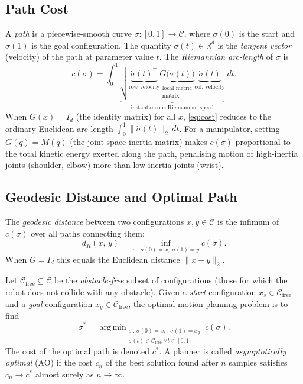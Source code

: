 \documentclass[journal]{IEEEtran}
\newcommand{\Cfree}{\mathcal{C}_{\mathrm{free}}}
\newcommand{\Cspace}{\mathcal{C}}
\newcommand{\dR}{d_{\!R}}
\DeclareMathOperator*{\argmin}{arg\,min}
\begin{document}
\subsection*{Path Cost}

A \emph{path} is a piecewise-smooth curve
$\sigma : [0,1] \to \Cspace$, where $\sigma(0)$ is the start and
$\sigma(1)$ is the goal configuration.
The quantity $\dot{\sigma}(t) \in \mathbb{R}^d$ is the \emph{tangent
vector} (velocity) of the path at parameter value $t$.
The \emph{Riemannian arc-length} of $\sigma$ is
\begin{equation}\label{eq:cost}
  c(\sigma)
  = \int_0^1 \!\underbrace{\sqrt{
      \underbrace{\dot{\sigma}(t)^\top}_{\text{row velocity}}
      \underbrace{G\!\bigl(\sigma(t)\bigr)}_{\substack{\text{local metric}\\\text{matrix}}}
      \underbrace{\dot{\sigma}(t)}_{\text{col.\ velocity}}
    }}_{\text{instantaneous Riemannian speed}}\; dt.
\end{equation}
When $G(x) = I_d$ (the identity matrix) for all $x$, \cref{eq:cost}
reduces to the ordinary Euclidean arc-length $\int_0^1\!\|\dot\sigma(t)\|_2\,dt$.
For a manipulator, setting $G(q) = M(q)$ (the joint-space inertia matrix)
makes $c(\sigma)$ proportional to the total kinetic energy exerted along
the path, penalising motion of high-inertia joints (shoulder, elbow) more
than low-inertia joints (wrist).

\subsection*{Geodesic Distance and Optimal Path}

The \emph{geodesic distance} between two configurations
$x, y \in \Cspace$ is the infimum of $c(\sigma)$ over all paths connecting
them:
\begin{equation}\label{eq:geodesic}
  \dR(x,\,y)
  = \inf_{\sigma\,:\,\sigma(0)=x,\;\sigma(1)=y} c(\sigma).
\end{equation}
When $G = I_d$ this equals the Euclidean distance $\|x - y\|_2$.

Let $\Cfree \subseteq \Cspace$ be the \emph{obstacle-free} subset
of configurations (those for which the robot does not collide with any
obstacle).
Given a \emph{start} configuration $x_s \in \Cfree$ and a
\emph{goal} configuration $x_g \in \Cfree$, the optimal motion-planning
problem is to find
\begin{equation}\label{eq:opt}
  \sigma^*
  = \argmin_{\substack{\sigma\,:\,\sigma(0)=x_s,\;\sigma(1)=x_g \\ \sigma(t)\in\Cfree\;\forall t\in[0,1]}}
    c(\sigma).
\end{equation}
The cost of the optimal path is denoted $c^*$.
A planner is called \emph{asymptotically optimal} (AO) if the cost
$c_n$ of the best solution found after $n$ samples satisfies
$c_n \to c^*$ almost surely as $n \to \infty$.
\end{document}
